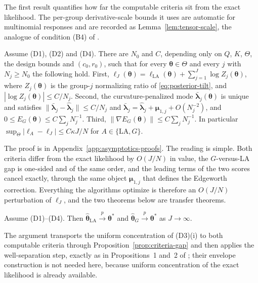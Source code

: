 The first result quantifies how far the computable criteria sit from the exact likelihood. The per-group derivative-scale bounds it uses are automatic for multinomial responses and are recorded as Lemma~\ref{lem:tensor-scale}, the analogue of condition (B4) of \citet{Yue2026}.

\begin{proposition}
Assume (D1), (D2) and (D4). There are $N_{0}$ and $C$, depending only on $Q$, $K$, $\Theta$, the design bounds and $(c_{0},r_{0})$, such that for every $\bm{\theta}\in\Theta$ and every $j$ with $N_{j}\geq N_{0}$ the following hold. First, $\ell_{J}(\bm{\theta})=\ell_{\text{LA}}(\bm{\theta})+\sum_{j=1}^{J}\log Z_{j}(\bm{\theta})$, where $Z_{j}(\bm{\theta})$ is the group-$j$ normalizing ratio of \eqref{eq:posterior-tilt}, and $|\log Z_{j}(\bm{\theta})|\leq C/N_{j}$. Second, the curvature-penalized mode $\bar{\bm{\lambda}}_{j}(\bm{\theta})$ is unique and satisfies $\|\bar{\bm{\lambda}}_{j}-\hat{\bm{\lambda}}_{j}\|\leq C/N_{j}$ and $\bar{\bm{\lambda}}_{j}=\hat{\bm{\lambda}}_{j}+\bm{\mu}_{1,j}+O(N_{j}^{-2})$, and $0\leq E_{G}(\bm{\theta})\leq C\sum_{j}N_{j}^{-1}$. Third, $\|\nabla E_{G}(\bm{\theta})\|\leq C\sum_{j}N_{j}^{-1}$. In particular $\sup_{\Theta}|\ell_{A}-\ell_{J}|\leq C\kappa J/N$ for $A\in\{\text{LA},G\}$.
\label{prop:criteria-gap}
\end{proposition}

The proof is in Appendix~\ref{app:asymptotics-proofs}. The reading is simple. Both criteria differ from the exact likelihood by $O(J/N)$ in value, the $G$-versus-LA gap is one-sided and of the same order, and the leading terms of the two scores cancel exactly, through the same object $\bm{\mu}_{1,j}$ that defines the Edgeworth correction. Everything the algorithms optimize is therefore an $O(J/N)$ perturbation of $\ell_{J}$, and the two theorems below are transfer theorems.

\begin{theorem}
Assume (D1)--(D4). Then $\hat{\bm{\theta}}_{\text{LA}}\xrightarrow{p}\bm{\theta}^{*}$ and $\hat{\bm{\theta}}_{G}\xrightarrow{p}\bm{\theta}^{*}$ as $J\to\infty$.
\label{thm:computable-consistency}
\end{theorem}

The argument transports the uniform concentration of (D3)(i) to both computable criteria through Proposition~\ref{prop:criteria-gap} and then applies the well-separation step, exactly as in Propositions~1 and~2 of \citet{Yue2026}; their envelope construction is not needed here, because uniform concentration of the exact likelihood is already available.

